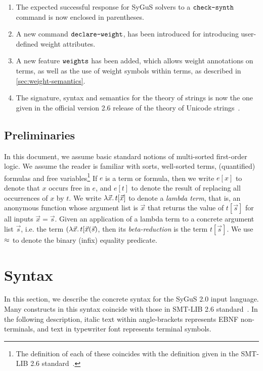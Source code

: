 \documentclass[english,a4paper,10pt]{article}
\begin{document}
\begin{enumerate}
\item The expected successful response for SyGuS solvers to a $\texttt{check-synth}$ command is now enclosed in parentheses.

\item A new command $\texttt{declare-weight}$, has been introduced for introducing user-defined weight attributes.

\item A new feature $\texttt{weights}$ has been added, which allows weight annotations on terms, 
as well as the use of weight symbols within terms, as described in \cref{sec:weight-semantics}.

\item
The signature, syntax and semantics for the theory of strings
is now the one given in the official version 2.6 release of the theory of Unicode strings~\cite{BarFT-RR-17}.
\end{enumerate}


\subsection{Preliminaries}
In this document, we assume basic standard notions of
multi-sorted first-order logic.
We assume the reader is familiar
with sorts, well-sorted terms, (quantified) formulas
and free variables\footnote{
The definition of each of these coincides with
the definition given in the SMT-LIB 2.6 standard~\cite{BarFT-RR-17}.
}
If $e$ is a term or formula,
then we write $e[x]$ to denote that $x$ occurs free in $e$,
and $e[t]$ to denote the result of replacing all occurrences of $x$ by $t$.
We write $\lambda \vec{x} \ldotp t[\vec{x}]$ to denote a \emph{lambda term},
that is, an anonymous function whose argument list is $\vec{x}$
that returns the value of $t[\vec{s}]$ for all inputs $\vec{x} = \vec{s}$.
Given an application of a lambda term to a concrete argument list $\vec{s}$,
i.e. the term $(\lambda \vec{x} \ldotp t[\vec{x}( \vec{s} )$,
then its \emph{beta-reduction} is the term $t[\vec{s}]$.
We use $\approx$ to denote the binary (infix) equality predicate.

\section{Syntax}
\label{sec:syntax}

In this section, we describe the concrete syntax
for the SyGuS 2.0 input language.
Many constructs in this syntax coincide
with those in SMT-LIB 2.6 standard~\cite{BarFT-RR-17}.
In the following description,
italic text within angle-brackets represents EBNF non-terminals,
and text in typewriter font represents terminal symbols.
\end{document}
